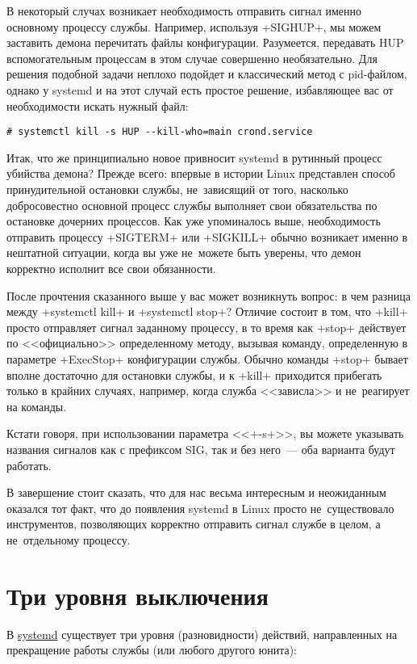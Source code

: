 \documentclass[10pt,oneside,a4paper]{article}
\begin{document}
В некоторый случах возникает необходимость отправить сигнал именно основному
процессу службы. Например, используя +SIGHUP+, мы можем заставить демона
перечитать файлы конфигурации. Разумеется, передавать HUP вспомогательным процессам
в этом случае совершенно необязательно. Для решения подобной
задачи неплохо подойдет и классический метод с pid-файлом, однако у
systemd и на этот случай есть простое решение, избавляющее вас от
необходимости искать нужный файл: 

\begin{Verbatim}
# systemctl kill -s HUP --kill-who=main crond.service
\end{Verbatim}

Итак, что же принципиально новое привносит systemd в рутинный процесс
убийства демона? Прежде всего: впервые в истории Linux представлен способ
принудительной остановки службы, не~зависящий от того, насколько
добросовестно основной процесс службы выполняет свои обязательства по
остановке дочерних процессов. Как уже упоминалось выше, необходимость
отправить процессу +SIGTERM+ или +SIGKILL+ обычно возникает именно
в нештатной ситуации, когда вы уже не~можете быть уверены, что демон
корректно исполнит все свои обязанности.

После прочтения сказанного выше у вас может возникнуть вопрос: в чем разница
между +systemctl kill+ и +systemctl stop+? Отличие состоит в том,
что +kill+ просто отправляет сигнал заданному процессу, в то время как
+stop+ действует по <<официально>> определенному методу, вызывая команду,
определенную в параметре +ExecStop+ конфигурации службы. Обычно команды
+stop+ бывает вполне достаточно для остановки службы, и к +kill+
приходится прибегать только в крайних случаях, например, когда служба
<<зависла>> и не~реагирует на команды.

Кстати говоря, при использовании параметра <<+-s+>>, вы можете указывать
названия сигналов как с префиксом SIG, так и без него~--- оба варианта будут
работать.

В завершение стоит сказать, что для нас весьма интересным и неожиданным
оказался тот факт, что до появления systemd в Linux просто не~существовало
инструментов, позволяющих корректно отправить сигнал службе в целом, а
не~отдельному процессу.

\section{Три уровня выключения}

В \href{http://www.freedesktop.org/wiki/Software/systemd}{systemd} существует
три уровня (разновидности) действий, направленных на прекращение работы службы
(или любого другого юнита):
\end{document}
